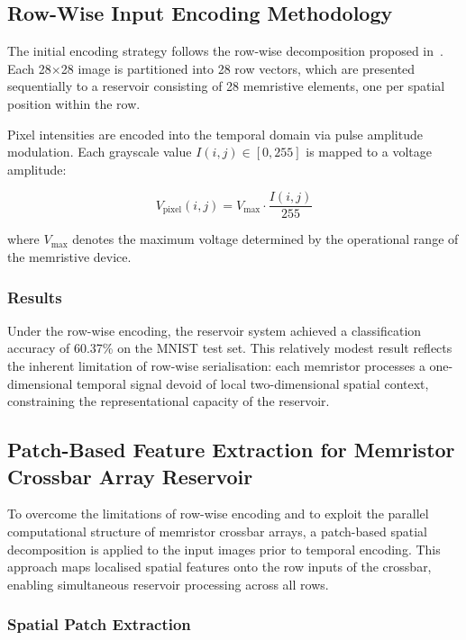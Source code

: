\documentclass[11pt, oneside]{article}
\begin{document}
\subsection{Row-Wise Input Encoding Methodology}

The initial encoding strategy follows the row-wise decomposition proposed in~\autocite{Du2017}. Each 28$\times$28 image is partitioned into 28 row vectors, which are presented sequentially to a reservoir consisting of 28 memristive elements, one per spatial position within the row.

Pixel intensities are encoded into the temporal domain via pulse amplitude modulation. Each grayscale value $I(i,j) \in [0, 255]$ is mapped to a voltage amplitude:

\begin{equation}
    V_{\text{pixel}}(i,j) = V_{\text{max}} \cdot \frac{I(i,j)}{255}
\end{equation}

\noindent where $V_{\text{max}}$ denotes the maximum voltage determined by the operational range of the memristive device.

\subsubsection{Results}

Under the row-wise encoding, the reservoir system achieved a classification accuracy of 60.37\% on the MNIST test set. This relatively modest result reflects the inherent limitation of row-wise serialisation: each memristor processes a one-dimensional temporal signal devoid of local two-dimensional spatial context, constraining the representational capacity of the reservoir.

\subsection{Patch-Based Feature Extraction for Memristor Crossbar Array Reservoir}

To overcome the limitations of row-wise encoding and to exploit the parallel computational structure of memristor crossbar arrays, a patch-based spatial decomposition is applied to the input images prior to temporal encoding. This approach maps localised spatial features onto the row inputs of the crossbar, enabling simultaneous reservoir processing across all rows.

\subsubsection{Spatial Patch Extraction}
\end{document}
